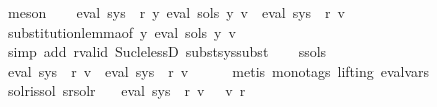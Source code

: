 \begin{isabellebody}
\ meson\isanewline
\ \ \isamarkupfalse%
\ {\isachardoublequoteopen}eval\ {\isacharparenleft}{\kern0pt}sys\ {\isacharbang}{\kern0pt}\ r{\isacharparenright}{\kern0pt}\ {\isacharparenleft}{\kern0pt}{\isasymlambda}y{\isachardot}{\kern0pt}\ eval\ {\isacharparenleft}{\kern0pt}sols\ y{\isacharparenright}{\kern0pt}\ v{\isacharparenright}{\kern0pt}\ {\isacharequal}{\kern0pt}\ eval\ {\isacharparenleft}{\kern0pt}sys{\isacharprime}{\kern0pt}\ {\isacharbang}{\kern0pt}\ r{\isacharparenright}{\kern0pt}\ v{\isachardoublequoteclose}\isanewline
\ \ \ \ \isamarkupfalse%
\ substitution{\isacharunderscore}{\kern0pt}lemma{\isacharbrackleft}{\kern0pt}of\ {\isachardoublequoteopen}{\isasymlambda}y{\isachardot}{\kern0pt}\ eval\ {\isacharparenleft}{\kern0pt}sols\ y{\isacharparenright}{\kern0pt}\ v{\isachardoublequoteclose}{\isacharbrackright}{\kern0pt}\isanewline
\ \ \ \ \isamarkupfalse%
\ {\isacharparenleft}{\kern0pt}simp\ add{\isacharcolon}{\kern0pt}\ r{\isacharunderscore}{\kern0pt}valid\ Suc{\isacharunderscore}{\kern0pt}le{\isacharunderscore}{\kern0pt}lessD\ subst{\isacharunderscore}{\kern0pt}sys{\isacharunderscore}{\kern0pt}subst{\isacharparenright}{\kern0pt}\isanewline
\ \ \isamarkupfalse%
\ s{\isacharunderscore}{\kern0pt}sols\ \isamarkupfalse%
\ {\isachardoublequoteopen}eval\ {\isacharparenleft}{\kern0pt}sys\ {\isacharbang}{\kern0pt}\ r{\isacharparenright}{\kern0pt}\ v\ {\isacharequal}{\kern0pt}\ eval\ {\isacharparenleft}{\kern0pt}sys{\isacharprime}{\kern0pt}\ {\isacharbang}{\kern0pt}\ r{\isacharparenright}{\kern0pt}\ v{\isachardoublequoteclose}\isanewline
\ \ \ \ \isamarkupfalse%
\ {\isacharparenleft}{\kern0pt}metis\ {\isacharparenleft}{\kern0pt}mono{\isacharunderscore}{\kern0pt}tags{\isacharcomma}{\kern0pt}\ lifting{\isacharparenright}{\kern0pt}\ eval{\isacharunderscore}{\kern0pt}vars{\isacharparenright}{\kern0pt}\isanewline
\ \ \isamarkupfalse%
\ sol{\isacharunderscore}{\kern0pt}r{\isacharunderscore}{\kern0pt}is{\isacharunderscore}{\kern0pt}sol\ s{\isacharunderscore}{\kern0pt}r{\isacharunderscore}{\kern0pt}sol{\isacharunderscore}{\kern0pt}r\ \isamarkupfalse%
\ {\isachardoublequoteopen}{\isasymPsi}\ {\isacharparenleft}{\kern0pt}eval\ {\isacharparenleft}{\kern0pt}sys\ {\isacharbang}{\kern0pt}\ r{\isacharparenright}{\kern0pt}\ v{\isacharparenright}{\kern0pt}\ {\isasymsubseteq}\ {\isasymPsi}\ {\isacharparenleft}{\kern0pt}v\ r{\isacharparenright}{\kern0pt}{\isachardoublequoteclose}\isanewline
\ \ \ \ \isamarkupfalse%

\end{isabellebody}
